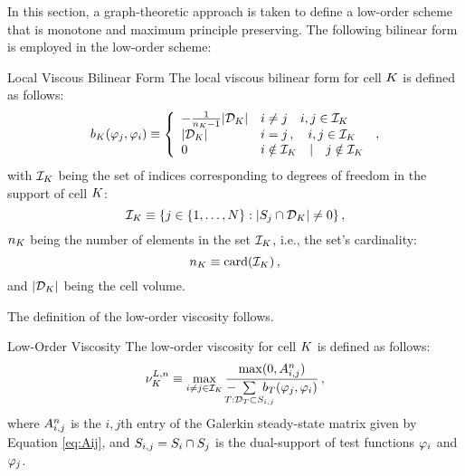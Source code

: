 In this section, a graph-theoretic approach is taken to define a low-order
scheme that is monotone and maximum principle preserving. The following
bilinear form is employed in the low-order scheme:
\begin{definition}{Local Viscous Bilinear Form}
   The local viscous bilinear form for cell $K$ is defined as follows:
   \begin{equation}\label{eq:bilinearform}
     \localviscbilinearform{\cell}{j}{i} \equiv \left\{\begin{array}{l l}
       -\frac{1}{\cardinality - 1}\cellvolume & i\ne j
       \quad i,j\in \indicescell \\
       \cellvolume & i = j \eqc \quad i,j\in \indicescell \\
       0           & i\notin\indicescell \quad | \quad j\notin\indicescell
     \end{array}\right. \eqc
   \end{equation}
   with $\indicescell$ being the set of indices corresponding to degrees of
   freedom in the support of cell $K$:
   \begin{equation}
     \indicescell \equiv \{j\in\{1,\ldots,N\}: |\support_j\cap \celldomain|\ne 0\}
     \eqc
   \end{equation}
   $\cardinality$ being the number of elements in the set $\indicescell$,
   i.e., the set's cardinality:
   \begin{equation}
     \cardinality \equiv \textup{card}(\indicescell) \eqc
   \end{equation} 
   and $|\mathcal{D}_K|$ being the cell volume.
\end{definition}
The definition of the low-order viscosity follows.
\begin{definition}{Low-Order Viscosity}
   The low-order viscosity for cell $K$ is defined as follows:
   \begin{equation}
     \lowordercellviscosity[\timeindex] \equiv \max\limits_{i\ne j\in\indicescell}
     \frac{\max(0,\ssmatrixletter\ij^\timeindex)}
     {-\mkern-20mu\sumKSij[T]\mkern-20mu\localviscbilinearform{T}{j}{i}}
     \eqc
   \end{equation}
   where $A_{i,j}^n$ is the $i,j$th entry of the Galerkin
   steady-state matrix given by Equation \eqref{eq:Aij}, and
   $S_{i,j}=S_i\cap S_j$ is the dual-support of test
   functions $\varphi_i$ and $\varphi_j$.
\end{definition}
